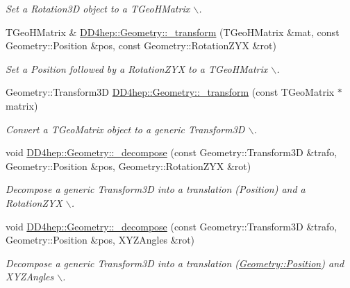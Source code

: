 \begin{DoxyCompactItemize}
\begin{DoxyCompactList}\small\item\em Set a Rotation3D object to a TGeoHMatrix $\backslash$. \item\end{DoxyCompactList}\item 
TGeoHMatrix \& \hyperlink{group___d_d4_h_e_p___g_e_o_m_e_t_r_y_ga71170881a8a2e3803a68f7e55d237188}{DD4hep::Geometry::\_\-transform} (TGeoHMatrix \&mat, const Geometry::Position \&pos, const Geometry::RotationZYX \&rot)
\begin{DoxyCompactList}\small\item\em Set a Position followed by a RotationZYX to a TGeoHMatrix $\backslash$. \item\end{DoxyCompactList}\item 
Geometry::Transform3D \hyperlink{group___d_d4_h_e_p___g_e_o_m_e_t_r_y_ga7d9b7297bf0cee38d702a6e460a030a1}{DD4hep::Geometry::\_\-transform} (const TGeoMatrix $\ast$matrix)
\begin{DoxyCompactList}\small\item\em Convert a TGeoMatrix object to a generic Transform3D $\backslash$. \item\end{DoxyCompactList}\item 
void \hyperlink{group___d_d4_h_e_p___g_e_o_m_e_t_r_y_ga9bb962c6fc39a0f8fc76420e08d24c7a}{DD4hep::Geometry::\_\-decompose} (const Geometry::Transform3D \&trafo, Geometry::Position \&pos, Geometry::RotationZYX \&rot)
\begin{DoxyCompactList}\small\item\em Decompose a generic Transform3D into a translation (Position) and a RotationZYX $\backslash$. \item\end{DoxyCompactList}\item 
void \hyperlink{group___d_d4_h_e_p___g_e_o_m_e_t_r_y_gad0cc5511671f40c3394c8688e7a2316f}{DD4hep::Geometry::\_\-decompose} (const Geometry::Transform3D \&trafo, Geometry::Position \&pos, XYZAngles \&rot)
\begin{DoxyCompactList}\small\item\em Decompose a generic Transform3D into a translation (\hyperlink{namespace_d_d4hep_1_1_geometry_a55083902099d03506c6db01b80404900}{Geometry::Position}) and XYZAngles $\backslash$. \item\end{DoxyCompactList}\item 

\end{DoxyCompactItemize}
